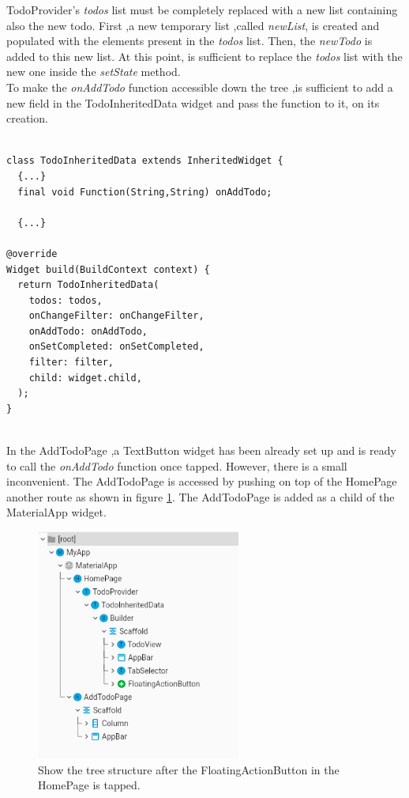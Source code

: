 TodoProvider’s \textit{todos }list must be completely replaced with a new list containing also the new todo. First ,a new temporary list ,called \textit{newList}, is created and populated with the elements present in the \textit{todos }list. Then, the \textit{newTodo }is added to this new list. At this point, is sufficient to replace the \textit{todos }list with the new one inside the \textit{setState} method.\\
To make the \textit{onAddTodo} function accessible down the tree ,is sufficient to add a new field in the TodoInheritedData widget and pass the function to it, on its creation.
\mbox{}\\
\begin{code}

\mbox{}

\label{code:2.33}
\begin{verbatim}

class TodoInheritedData extends InheritedWidget {
  {...}
  final void Function(String,String) onAddTodo;

  {...}

@override
Widget build(BuildContext context) {
  return TodoInheritedData(
    todos: todos,
    onChangeFilter: onChangeFilter,
    onAddTodo: onAddTodo,
    onSetCompleted: onSetCompleted,
    filter: filter,
    child: widget.child,
  );
}
\end{verbatim}
\end{code}
\mbox{}\\
In the AddTodoPage ,a TextButton widget has been already set up and is ready to call the \textit{onAddTodo }function once tapped. However, there is a small inconvenient. The AddTodoPage is accessed by pushing on top of the HomePage another route as shown in figure \ref{fig:add_todo_page_tree_structure}. The AddTodoPage is added as a child of the MaterialApp widget.

\begin{figure}[H]
    \centering
    \includegraphics[width=0.6\textwidth]{Images/tree_structure_on_AddTodoPage.png}
    \caption{Show the tree structure after the FloatingActionButton in the HomePage is tapped.}
    \label{fig:add_todo_page_tree_structure}
\end{figure}


